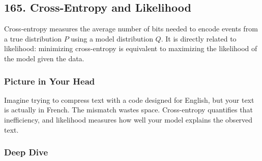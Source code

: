 \documentclass[
  letterpaper,
  DIV=11,
  numbers=noendperiod]{scrreprt}
\begin{document}
\subsection{165. Cross-Entropy and
Likelihood}\label{cross-entropy-and-likelihood}

Cross-entropy measures the average number of bits needed to encode
events from a true distribution \(P\) using a model distribution \(Q\).
It is directly related to likelihood: minimizing cross-entropy is
equivalent to maximizing the likelihood of the model given the data.

\subsubsection{Picture in Your Head}\label{picture-in-your-head-164}

Imagine trying to compress text with a code designed for English, but
your text is actually in French. The mismatch wastes space.
Cross-entropy quantifies that inefficiency, and likelihood measures how
well your model explains the observed text.

\subsubsection{Deep Dive}\label{deep-dive-164}
\end{document}
